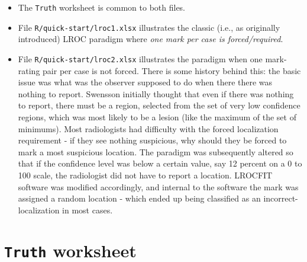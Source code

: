 \documentclass[
]{book}
\begin{document}
\begin{itemize}
\item
  The \texttt{Truth} worksheet is common to both files.
\item
  File \texttt{R/quick-start/lroc1.xlsx} illustrates the classic (i.e., as originally introduced) LROC paradigm where \emph{one mark per case is forced/required}.
\item
  File \texttt{R/quick-start/lroc2.xlsx} illustrates the paradigm when one mark-rating pair per case is not forced. There is some history behind this: the basic issue was what was the observer supposed to do when there there was nothing to report. Swensson initially thought that even if there was nothing to report, there must be a region, selected from the set of very low confidence regions, which was most likely to be a lesion (like the maximum of the set of minimums). Most radiologists had difficulty with the forced localization requirement - if they see nothing suspicious, why should they be forced to mark a most suspicious location. The paradigm was subsequently altered so that if the confidence level was below a certain value, say 12 percent on a 0 to 100 scale, the radiologist did not have to report a location. LROCFIT software was modified accordingly, and internal to the software the mark was assigned a random location - which ended up being classified as an incorrect-localization in most cases.
\end{itemize}

\hypertarget{quick-start-lroc-truth}{%
\section{\texorpdfstring{\texttt{Truth} worksheet}{Truth worksheet}}\label{quick-start-lroc-truth}}
\end{document}
